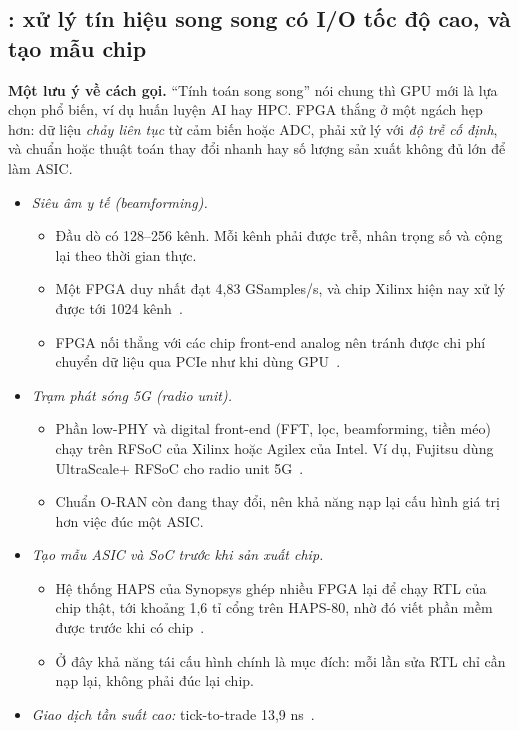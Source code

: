 \documentclass[11pt,a4paper]{article}
\begin{document}
\subsection{\FPGA: xử lý tín hiệu song song có I/O tốc độ cao, và tạo mẫu chip}

\textbf{Một lưu ý về cách gọi.} ``Tính toán song song'' nói chung thì GPU mới là lựa chọn phổ biến, ví dụ huấn luyện AI hay HPC. FPGA thắng ở một ngách hẹp hơn: dữ liệu \emph{chảy liên tục} từ cảm biến hoặc ADC, phải xử lý với \emph{độ trễ cố định}, và chuẩn hoặc thuật toán thay đổi nhanh hay số lượng sản xuất không đủ lớn để làm ASIC.
\begin{itemize}
\item \emph{Siêu âm y tế (beamforming).}
  \begin{itemize}
  \item Đầu dò có 128–256 kênh. Mỗi kênh phải được trễ, nhân trọng số và cộng lại theo thời gian thực.
  \item Một FPGA duy nhất đạt 4,83 GSamples/s, và chip Xilinx hiện nay xử lý được tới 1024 kênh~\cite{kou}.
  \item FPGA nối thẳng với các chip front-end analog nên tránh được chi phí chuyển dữ liệu qua PCIe như khi dùng GPU~\cite{kou}.
  \end{itemize}
\item \emph{Trạm phát sóng 5G (radio unit).}
  \begin{itemize}
  \item Phần low-PHY và digital front-end (FFT, lọc, beamforming, tiền méo) chạy trên RFSoC của Xilinx hoặc Agilex của Intel. Ví dụ, Fujitsu dùng UltraScale+ RFSoC cho radio unit 5G~\cite{hpcwire-fujitsu,intel-oran}.
  \item Chuẩn O-RAN còn đang thay đổi, nên khả năng nạp lại cấu hình giá trị hơn việc đúc một ASIC.
  \end{itemize}
\item \emph{Tạo mẫu ASIC và SoC trước khi sản xuất chip.}
  \begin{itemize}
  \item Hệ thống HAPS của Synopsys ghép nhiều FPGA lại để chạy RTL của chip thật, tới khoảng 1,6 tỉ cổng trên HAPS-80, nhờ đó viết phần mềm được trước khi có chip~\cite{haps}.
  \item Ở đây khả năng tái cấu hình chính là mục đích: mỗi lần sửa RTL chỉ cần nạp lại, không phải đúc lại chip.
  \end{itemize}
\item \emph{Giao dịch tần suất cao:} tick-to-trade 13,9 ns~\cite{stac}.

\end{itemize}
\end{document}
